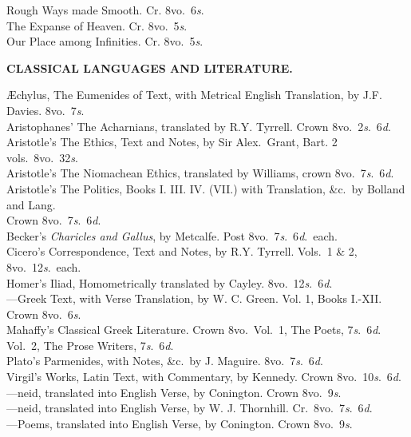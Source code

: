 \documentclass[letterpaper,12pt,oneside,openany]{memoir}
\newcommand{\D}{\hspace*{5mm}}
\newcommand{\E}{\hspace*{2mm}---\hspace*{2mm}}
\begin{document}
\begin{footnotesize}
Rough Ways made Smooth. Cr. 8vo.\ 6\textit{s}.\\
The Expanse of Heaven. Cr. 8vo.\ 5\textit{s}.\\
Our Place among Infinities. Cr. 8vo.\ 5\textit{s}.
\begin{center}
\textbf{CLASSICAL LANGUAGES AND LITERATURE.}
\end{center}
{\AE}chylus, The Eumenides of Text, with Metrical English Translation, by J.F. Davies. 8vo.\ 7\textit{s}.\\
Aristophanes' The Acharnians, translated by R.Y. Tyrrell. Crown 8vo.\ 2\textit{s}.\ 6\textit{d}.\\
Aristotle's The Ethics, Text and Notes, by Sir Alex.\ Grant, Bart. 2 vols.\ 8vo.\ 32\textit{s}.\\
Aristotle's The Niomachean Ethics, translated by Williams, crown 8vo.\ 7\textit{s}.\ 6\textit{d}.\\
Aristotle's The Politics, Books I\@. III\@. IV\@. (VII.) with Translation, \&c.\ by Bolland and Lang.\\
\D Crown 8vo.\ 7\textit{s}.\ 6\textit{d}.\\
Becker's \emph{Charicles and Gallus}, by Metcalfe. Post 8vo.\ 7\textit{s}.\ 6\textit{d}.\ each.\\
Cicero's Correspondence, Text and Notes, by R.Y. Tyrrell. Vols.\ 1 \& 2, 8vo.\ 12\textit{s}.\ each.\\
Homer's Iliad, Homometrically translated by Cayley. 8vo.\ 12\textit{s}.\ 6\textit{d}.\\
\E Greek Text, with Verse Translation, by W. C. Green. Vol. 1, Books I.-XII\@. Crown 8vo.\ 6\textit{s}.\\
Mahaffy's Classical Greek Literature. Crown 8vo.\ Vol.\ 1, The Poets, 7\textit{s}.\ 6\textit{d}. \\
\D Vol.\ 2, The Prose Writers, 7\textit{s}.\ 6\textit{d}.\\
Plato's Parmenides, with Notes, \&c.\ by J. Maguire. 8vo.\ 7\textit{s}.\ 6\textit{d}.\\
Virgil's Works, Latin Text, with Commentary, by Kennedy. Crown 8vo.\ 10\textit{s}.\ 6\textit{d}.\\
\E {\AE}neid, translated into English Verse, by Conington. Crown 8vo.\ 9\textit{s}.\\
\E {\AE}neid, translated into English Verse, by W. J. Thornhill. Cr.\ 8vo.\ 7\textit{s}.\ 6\textit{d}.\\
\E Poems, translated into English Verse, by Conington. Crown 8vo.\ 9\textit{s}.\\

\end{footnotesize}
\end{document}
